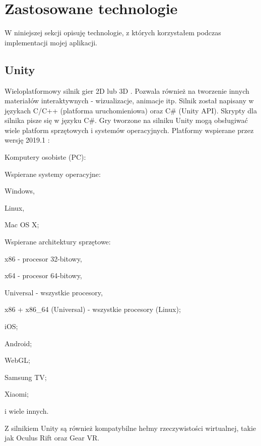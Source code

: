 \section{Zastosowane technologie}
W niniejszej sekcji opisuję technologie, z których korzystałem podczas implementacji mojej aplikacji.
\subsection{Unity}
Wieloplatformowy silnik gier 2D lub 3D \cite{unity:opis}. Pozwala również na tworzenie innych materiałów interaktywnych - wizualizacje, animacje itp. Silnik został napisany w językach C/C++ (platforma uruchomieniowa) oraz C\# (Unity API). Skrypty dla silnika pisze się w języku C\#. Gry tworzone na silniku Unity mogą obsługiwać wiele platform sprzętowych i systemów operacyjnych. 
Platformy wspierane przez wersję 2019.1 \cite{unity:buildOptions}:
\begin{enumerate*}
\item Komputery osobiste (PC):
\begin{enumerate*}
\item Wspierane systemy operacyjne:
\begin{itemize*}
\item Windows,
\item Linux,
\item Mac OS X;
\end{itemize*}
\item Wspierane architektury sprzętowe:
\begin{itemize*}
\item x86 - procesor 32-bitowy,
\item x64 - procesor 64-bitowy,
\item Universal - wszystkie procesory,
\item x86 + x86\_64 (Universal) - wszystkie procesory (Linux);
\end{itemize*}
\end{enumerate*}
\item iOS;
\item Android;
\item WebGL;
\item Samsung TV;
\item Xiaomi;
\item i wiele innych.
\end{enumerate*}

Z silnikiem Unity są również kompatybilne hełmy rzeczywistości wirtualnej, takie jak Oculus Rift oraz Gear VR.

